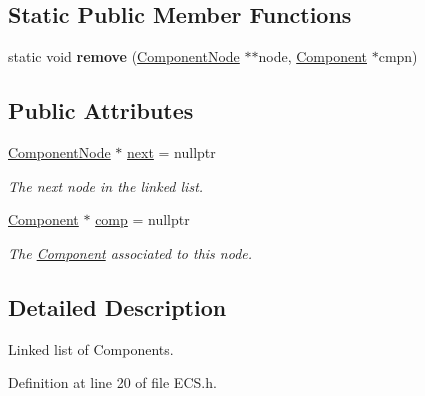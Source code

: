 \subsection*{Static Public Member Functions}
\begin{DoxyCompactItemize}
\item 
\mbox{\label{structnta_1_1ComponentNode_a92108bb1e99cd8717e7bb8eae5a20b5b}} 
static void {\bfseries remove} (\hyperlink{structnta_1_1ComponentNode}{Component\+Node} $\ast$$\ast$node, \hyperlink{classnta_1_1Component}{Component} $\ast$cmpn)
\end{DoxyCompactItemize}
\subsection*{Public Attributes}
\begin{DoxyCompactItemize}
\item 
\mbox{\label{structnta_1_1ComponentNode_a2803a165c62a6f6424bd97fc90761bc9}} 
\hyperlink{structnta_1_1ComponentNode}{Component\+Node} $\ast$ \hyperlink{structnta_1_1ComponentNode_a2803a165c62a6f6424bd97fc90761bc9}{next} = nullptr
\begin{DoxyCompactList}\small\item\em The next node in the linked list. \end{DoxyCompactList}\item 
\mbox{\label{structnta_1_1ComponentNode_abf0a5f4511ea70f01006e17d35a0a5f7}} 
\hyperlink{classnta_1_1Component}{Component} $\ast$ \hyperlink{structnta_1_1ComponentNode_abf0a5f4511ea70f01006e17d35a0a5f7}{comp} = nullptr
\begin{DoxyCompactList}\small\item\em The \hyperlink{classnta_1_1Component}{Component} associated to this node. \end{DoxyCompactList}\end{DoxyCompactItemize}


\subsection{Detailed Description}
Linked list of Components. 

Definition at line 20 of file E\+C\+S.\+h.



